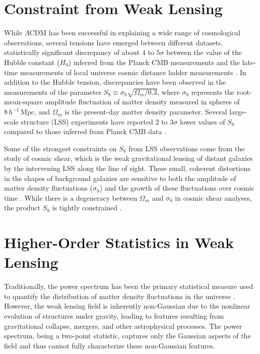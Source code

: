 \section{Constraint from Weak Lensing}
While $\Lambda$CDM has been successful in explaining a wide range of cosmological observations, several tensions have emerged between different datasets. statistically significant discrepancy of about $4$ to $5\sigma$ between the value of the Hubble constant ($H_0$) inferred from the Planck CMB measurements \citep{2021CQGra..38o3001D} and the late-time measurements of local universe cosmic distance ladder measurements \citep{2022ApJ...934L...7R}. In addition to the Hubble tension, discrepancies have been observed in the measurements of the parameter $S_8 \equiv \sigma_8 \sqrt{\Omega_m/0.3}$, where $\sigma_8$ represents the root-mean-square amplitude fluctuation of matter density measured in spheres of $8\, h^{-1}\,\mathrm{Mpc}$, and $\Omega_m$ is the present-day matter density parameter. Several large-scale structure (LSS) experiments have reported $2$ to $3\sigma$ lower values of $S_8$ compared to those inferred from Planck CMB data \citep{2019PASJ...71...43H, 2021A&A...645A.104A, 2021JCAP...10..030G}.

Some of the strongest constraints on $S_8$ from LSS observations come from the study of cosmic shear, which is the weak gravitational lensing of distant galaxies by the intervening LSS along the line of sight. 
These small, coherent distortions in the shapes of background galaxies are sensitive to both the amplitude of matter density fluctuations ($\sigma_8$) and the growth of these fluctuations over cosmic time \citep{2001PhR...340..291B, 2010CQGra..27w3001B, 2015RPPh...78h6901K}. While there is a degeneracy between $\Omega_m$ and $\sigma_8$ in cosmic shear analyses, the product $S_8$ is tightly constrained \citep{2015RPPh...78h6901K, 2018ARA&A..56..393M}. 


\section{Higher-Order Statistics in Weak Lensing}
Traditionally, the power spectrum has been the primary statistical measure used to quantify the distribution of matter density fluctuations in the universe \citep{2019PASJ...71...43H, 2023PhRvD.108l3519D}. However, the weak lensing field is inherently non-Gaussian due to the nonlinear evolution of structures under gravity, leading to features resulting from gravitational collapse, mergers, and other astrophysical processes. The power spectrum, being a two-point statistic, captures only the Gaussian aspects of the field and thus cannot fully characterize these non-Gaussian features.

